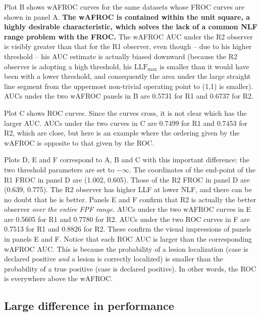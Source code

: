 \documentclass[
]{book}
\begin{document}
Plot B shows wAFROC curves for the same datasets whose FROC curves are shown in panel A. \textbf{The wAFROC is contained within the unit square, a highly desirable characteristic, which solves the lack of a common NLF range problem with the FROC.} The wAFROC AUC under the R2 observer is visibly greater than that for the R1 observer, even though -- due to his higher threshold -- his AUC estimate is actually biased downward (because the R2 observer is adopting a high threshold, his \(\text{LLF}_{\text{max}}\) is smaller than it would have been with a lower threshold, and consequently the area under the large straight line segment from the uppermost non-trivial operating point to (1,1) is smaller). AUCs under the two wAFROC panels in B are 0.5731 for R1 and 0.6737 for R2.

Plot C shows ROC curves. Since the curves cross, it is not clear which has the larger AUC. AUCs under the two curves in C are 0.7499 for R1 and 0.7453 for R2, which are close, but here is an example where the ordering given by the wAFROC is opposite to that given by the ROC.

Plots D, E and F correspond to A, B and C with this important difference: the two threshold parameters are set to \(-\infty\). The coordinates of the end-point of the R1 FROC in panel D are (1.002, 0.605). Those of the R2 FROC in panel D are (0.639, 0.775). The R2 observer has higher LLF at lower NLF, and there can be no doubt that he is better. Panels E and F confirm that R2 is actually the better observer \emph{over the entire FPF range}. AUCs under the two wAFROC curves in E are 0.5605 for R1 and 0.7780 for R2. AUCs under the two ROC curves in F are 0.7513 for R1 and 0.8826 for R2. These confirm the visual impressions of panels in panels E and F. Notice that each ROC AUC is larger than the corresponding wAFROC AUC. This is because the probability of a lesion localization (case is declared positive \emph{and} a lesion is correctly localized) is smaller than the probability of a true positive (case is declared positive). In other words, the ROC is everywhere above the wAFROC.

\hypertarget{large-difference-in-performance}{%
\subsection{Large difference in performance}\label{large-difference-in-performance}}
\end{document}
